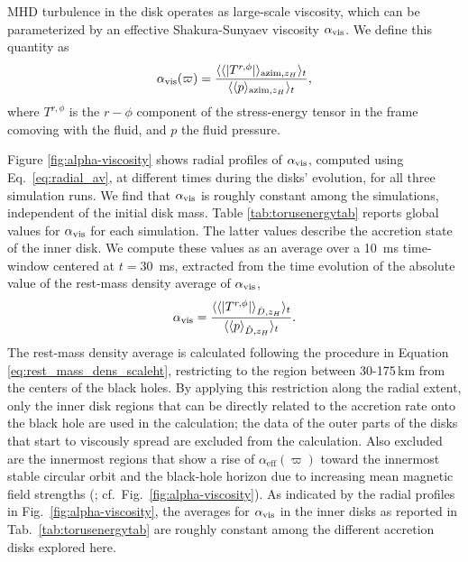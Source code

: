 MHD turbulence in the disk operates as large-scale viscosity, which can be parameterized by an effective Shakura-Sunyaev viscosity $\alpha_{\rm vis}$. We define this quantity as
\begin{equation}
    \alpha_{\rm vis} (\varpi) = \frac{\langle \langle |T^{r,\phi}|\rangle_{{\rm azim}, z_H}\rangle_t}{\langle \langle p \rangle_{{\rm azim}, z_H}\rangle_t}, \label{eq:alpha_visc_def_0D}
\end{equation}
where $T^{r,\phi}$ is the $r-\phi$ component of the stress-energy tensor in the frame comoving with the fluid, and $p$ the fluid pressure. %

Figure \ref{fig:alpha-viscosity} shows radial profiles of $\alpha_{\rm vis}$, computed using Eq.~\eqref{eq:radial_av}, at different times during the disks' evolution, for all three simulation runs. We find that $\alpha_{\rm vis}$ is roughly constant among the simulations, independent of the initial disk mass. Table \ref{tab:torusenergytab} reports global values for $\alpha_{\rm vis}$ for each simulation. The latter values describe the accretion state of the inner disk. We compute these values as an average over a 10~ms time-window centered at $t = 30$~ms, extracted from the time evolution of the absolute value of the rest-mass density average of $\alpha_{\rm vis}$,
\begin{equation}
    \alpha_{\rm vis} = \frac{\langle \langle |T^{r,\phi}|\rangle_{\hat{D}, z_H}\rangle_t}{\langle \langle p \rangle_{\hat{D}, z_H}\rangle_t}. \label{eq:alpha_visc_def_1D}
\end{equation}
The rest-mass density average is calculated following the procedure in Equation \eqref{eq:rest_mass_dens_scaleht}, restricting to the region between 30-175\,km from the centers of the black holes. By applying this restriction along the radial extent, only the inner disk regions that can be directly related to the accretion rate onto the black hole are used in the calculation; the data of the outer parts of the disks that start to viscously spread are excluded from the calculation. Also excluded are the innermost regions that show a rise of $\alpha_\mathrm{eff}(\varpi)$ toward the innermost stable circular orbit and the black-hole horizon due to increasing mean magnetic field strengths (\cite{penna_shakura-sunyaev_2013}; cf.~Fig.~\ref{fig:alpha-viscosity}). As indicated by the radial profiles in Fig.~\ref{fig:alpha-viscosity}, the averages for $\alpha_{\rm vis}$ in the inner disks as reported in Tab.~\ref{tab:torusenergytab} are roughly constant among the different accretion disks explored here.

